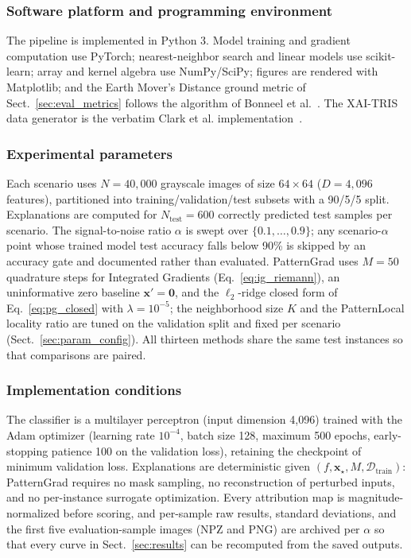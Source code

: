 \documentclass[pdflatex,sn-mathphys-num]{sn-jnl}
\theoremstyle{thmstyleone}
\theoremstyle{thmstyletwo}%
\theoremstyle{thmstylethree}%
\begin{document}
\subsubsection{Software platform and programming environment}
The pipeline is implemented in Python 3. Model training and gradient computation use PyTorch; nearest-neighbor search and linear models use scikit-learn; array and kernel algebra use NumPy/SciPy; figures are rendered with Matplotlib; and the Earth Mover's Distance ground metric of Sect.~\ref{sec:eval_metrics} follows the algorithm of Bonneel et al.~\cite{bonneel2011}. The XAI-TRIS data generator is the verbatim Clark et al. implementation~\cite{clark2024}.

\subsubsection{Experimental parameters}
Each scenario uses $N=40{,}000$ grayscale images of size $64\times64$ ($D=4{,}096$ features), partitioned into training/validation/test subsets with a 90/5/5 split. Explanations are computed for $N_{\text{test}}=600$ correctly predicted test samples per scenario. The signal-to-noise ratio $\alpha$ is swept over $\{0.1,\dots,0.9\}$; any scenario-$\alpha$ point whose trained model test accuracy falls below 90\% is skipped by an accuracy gate and documented rather than evaluated. PatternGrad uses $M=50$ quadrature steps for Integrated Gradients (Eq.~\eqref{eq:ig_riemann}), an uninformative zero baseline $\mathbf{x}'=\mathbf{0}$, and the $\ell_2$-ridge closed form of Eq.~\eqref{eq:pg_closed} with $\lambda=10^{-5}$; the neighborhood size $K$ and the PatternLocal locality ratio are tuned on the validation split and fixed per scenario (Sect.~\ref{sec:param_config}). All thirteen methods share the same test instances so that comparisons are paired.

\subsubsection{Implementation conditions}
The classifier is a multilayer perceptron (input dimension 4{,}096) trained with the Adam optimizer (learning rate $10^{-4}$, batch size 128, maximum 500 epochs, early-stopping patience 100 on the validation loss), retaining the checkpoint of minimum validation loss. Explanations are deterministic given $(f,\mathbf{x}_\star,M,\mathcal{D}_{\text{train}})$: PatternGrad requires no mask sampling, no reconstruction of perturbed inputs, and no per-instance surrogate optimization. Every attribution map is magnitude-normalized before scoring, and per-sample raw results, standard deviations, and the first five evaluation-sample images (NPZ and PNG) are archived per $\alpha$ so that every curve in Sect.~\ref{sec:results} can be recomputed from the saved outputs.
\end{document}
